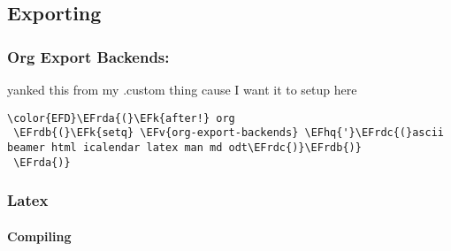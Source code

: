 \documentclass{article}
\newcommand{\EFk}[1]{\textcolor{EFk}{#1}} %
\newcommand{\EFv}[1]{\textcolor{EFv}{#1}} %
\newcommand{\EFhq}[1]{#1} %
\newcommand{\EFrda}[1]{\textcolor{EFrda}{#1}} %
\newcommand{\EFrdb}[1]{\textcolor{EFrdb}{#1}} %
\newcommand{\EFrdc}[1]{\textcolor{EFrdc}{#1}} %
\begin{document}
\subsection{Exporting}
\label{sec:orgbbe047e}
\subsubsection{Org Export Backends:}
\label{sec:orgb1fc493}
yanked this from my .custom thing cause I want it to setup here
\begin{Code}
\begin{Verbatim}
\color{EFD}\EFrda{(}\EFk{after!} org 
 \EFrdb{(}\EFk{setq} \EFv{org-export-backends} \EFhq{'}\EFrdc{(}ascii beamer html icalendar latex man md odt\EFrdc{)}\EFrdb{)}
 \EFrda{)}
\end{Verbatim}
\end{Code}

\subsubsection{Latex}
\label{sec:org1f1c35b}
\paragraph{Compiling}
\label{sec:org635dbd4}
\end{document}
